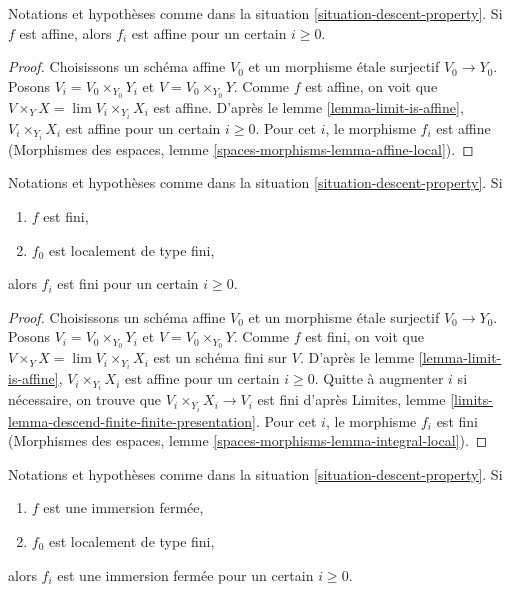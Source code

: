 \begin{lemma}
\label{lemma-descend-affine}
Notations et hypothèses comme dans la situation \ref{situation-descent-property}. Si
$f$ est affine, alors $f_i$ est affine pour un certain $i \geq 0$.
\end{lemma}

\begin{proof}
Choisissons un schéma affine $V_0$ et un morphisme étale surjectif $V_0 \to Y_0$.
Posons $V_i = V_0 \times_{Y_0} Y_i$ et $V = V_0 \times_{Y_0} Y$.
Comme $f$ est affine, on voit que $V \times_Y X = \lim V_i \times_{Y_i} X_i$
est affine. D'après le lemme \ref{lemma-limit-is-affine},
$V_i \times_{Y_i} X_i$ est affine pour un certain $i \geq 0$. Pour cet $i$, le morphisme
$f_i$ est affine
(Morphismes des espaces, lemme \ref{spaces-morphisms-lemma-affine-local}).
\end{proof}

\begin{lemma}
\label{lemma-descend-finite}
Notations et hypothèses comme dans la situation \ref{situation-descent-property}. Si
\begin{enumerate}
\item $f$ est fini,
\item $f_0$ est localement de type fini,
\end{enumerate}
alors $f_i$ est fini pour un certain $i \geq 0$.
\end{lemma}

\begin{proof}
Choisissons un schéma affine $V_0$ et un morphisme étale surjectif $V_0 \to Y_0$.
Posons $V_i = V_0 \times_{Y_0} Y_i$ et $V = V_0 \times_{Y_0} Y$.
Comme $f$ est fini, on voit que $V \times_Y X = \lim V_i \times_{Y_i} X_i$
est un schéma fini sur $V$. D'après le lemme \ref{lemma-limit-is-affine},
$V_i \times_{Y_i} X_i$ est affine pour un certain $i \geq 0$. Quitte à augmenter $i$ si
nécessaire, on trouve que $V_i \times_{Y_i} X_i \to V_i$ est fini d'après
Limites, lemme \ref{limits-lemma-descend-finite-finite-presentation}.
Pour cet $i$, le morphisme $f_i$ est fini
(Morphismes des espaces, lemme \ref{spaces-morphisms-lemma-integral-local}).
\end{proof}

\begin{lemma}
\label{lemma-descend-closed-immersion}
Notations et hypothèses comme dans la situation \ref{situation-descent-property}. Si
\begin{enumerate}
\item $f$ est une immersion fermée,
\item $f_0$ est localement de type fini,
\end{enumerate}
alors $f_i$ est une immersion fermée pour un certain $i \geq 0$.
\end{lemma}


